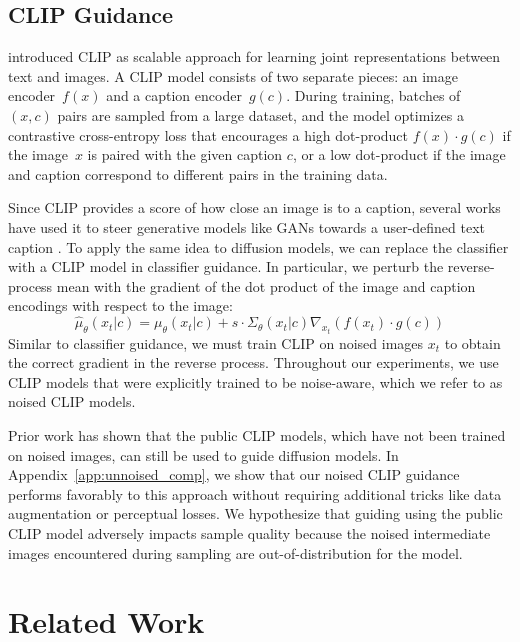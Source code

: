 \documentclass{article}
\begin{document}
\subsection{CLIP Guidance}
\label{sec:clip}

\citet{clip} introduced CLIP as scalable approach for learning joint representations between text and images. A CLIP model consists of two separate pieces: an image encoder~$f(x)$ and a caption encoder~$g(c)$. During training, batches of~$(x, c)$ pairs are sampled from a large dataset, and the model optimizes a contrastive cross-entropy loss that encourages a high dot-product $f(x) \cdot g(c)$ if the image~$x$ is paired with the given caption $c$, or a low dot-product if the image and caption correspond to different pairs in the training data.





Since CLIP provides a score of how close an image is to a caption, several works have used it to steer generative models like GANs towards a user-defined text caption \cite{clipglass,styleclip,bigsleep,stylegannada}. To apply the same idea to diffusion models, we can replace the classifier with a CLIP model in classifier guidance. In particular, we perturb the reverse-process mean with the gradient of the dot product of the image and caption encodings with respect to the image:
$$\hat{\mu}_{\theta}(x_t|c) = \mu_{\theta}(x_t|c) + s \cdot \Sigma_{\theta}(x_t|c) \nabla_{x_t} \left(f(x_t) \cdot g(c) \right)$$
Similar to classifier guidance, we must train CLIP on noised images $x_t$ to obtain the correct gradient in the reverse process. Throughout our experiments, we use CLIP models that were explicitly trained to be noise-aware, which we refer to as noised CLIP models.

Prior work \citet{clipdiff,secondarymodelmethod} has shown that the public CLIP models, which have not been trained on noised images, can still be used to guide diffusion models. In Appendix~\ref{app:unnoised_comp}, we show that our noised CLIP guidance performs favorably to this approach without requiring additional tricks like data augmentation or perceptual losses. We hypothesize that guiding using the public CLIP model adversely impacts sample quality because the noised intermediate images encountered during sampling are out-of-distribution for the model.

\section{Related Work}
\label{sec:related_work}
\end{document}
